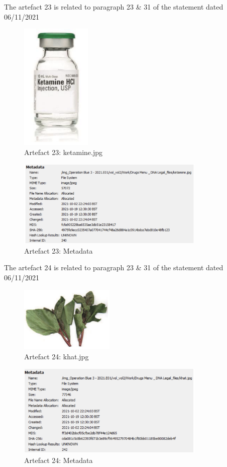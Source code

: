 The artefact 23 is related to paragraph 23 \& 31 of the statement
dated 06/11/2021
\begin{figure}[H]
  \centering
  \includegraphics[width=0.3\textwidth]{figures/artefact23}
  \caption{Artefact 23: ketamine.jpg}
  \label{f:artefact23}
\end{figure}
\begin{figure}[H]
  \centering
  \includegraphics[width=0.8\textwidth]{figures/meta23}
  \caption{Artefact 23: Metadata}
  \label{f:meta23}
\end{figure}
The artefact 24 is related to paragraph 23 \& 31 of the statement dated
06/11/2021
\begin{figure}[H]
  \centering
  \includegraphics[width=0.4\textwidth]{figures/artefact24}
  \caption{Artefact 24: khat.jpg}
  \label{f:artefact24}
\end{figure}
\begin{figure}[H]
  \centering
  \includegraphics[width=0.8\textwidth]{figures/meta24}
  \caption{Artefact 24: Metadata}
  \label{f:meta24}
\end{figure}

